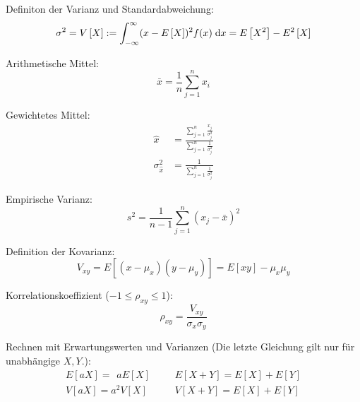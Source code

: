 			\noindent
			Definiton der Varianz und Standardabweichung:
			\begin{equation}
				\sigma^2 = V\left[ X \right] := \int_{-\infty}^{\infty} (x-E\left[X\right])^2f(x)\;\mathrm{d} x = E\left[X^2\right]-E^2\left[X\right]
			\end{equation}

			\noindent
			Arithmetische Mittel:
			\begin{equation}
				\bar{x}=\frac{1}{n}\sum_{j=1}^n x_i
			\end{equation}

			\noindent
			Gewichtetes Mittel:
			\begin{equation}
				\begin{aligned}
					\hat{x} &= \frac{\sum_{j=1}^n \frac{x_j}{\sigma_j^2}}{\sum_{j=1}^n \frac{1}{\sigma_j^2}} \\
					\sigma_{\hat{x}}^2 &= \frac{1}{\sum_{j=1}^n \frac{1}{\sigma_j^2}}
				\end{aligned}
			\end{equation}

			\noindent
			Empirische Varianz:
			\begin{equation}
				s^2 = \frac{1}{n-1}\sum_{j=1}^n (x_j-\bar{x})^2
			\end{equation}

			\noindent
			Definition der Kovarianz:
			\begin{equation}
				V_{xy} = E\left[(x-\mu_x)(y-\mu_y)\right] = E\left[xy\right]-\mu_x\mu_y
			\end{equation}

			\noindent
			Korrelationskoeffizient ($-1\le\rho_{xy}\le 1$):
			\begin{equation}
				\rho_{xy} = \frac{V_{xy}}{\sigma_x\sigma_y}
			\end{equation}

			\noindent
			Rechnen mit Erwartungswerten und Varianzen (Die letzte Gleichung gilt nur für unabhängige $X, Y$.):
			\begin{equation}
				\begin{array}{rl}
					E\left[aX\right] = \phantom{^2}a E\left[X\right]
					&\hspace{20pt}
					E\left[X+Y\right] = E\left[X\right] + E\left[Y\right]
					\\
					V\left[aX\right] = a^2 V\left[X\right]
					&\hspace{20pt}
					V\left[X+Y\right] = E\left[X\right] + E\left[Y\right]
					\\
				\end{array}
			\end{equation}

